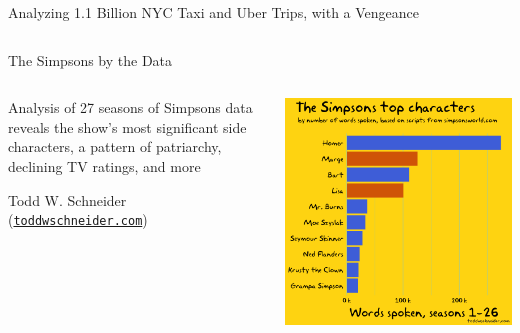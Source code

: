 \documentclass[10pt,aspectratio=169]{beamer}
\begin{document}
\begin{frame}{Analyzing 1.1 Billion NYC Taxi and Uber Trips, with a Vengeance}
\begin{columns}
\begin{column}{.3\textwidth}
\begin{center}
      \end{center}
    \end{column}
  \end{columns}
\end{frame}


\begin{frame}{The Simpsons by the Data}
  \begin{columns}
    \begin{column}{.5\textwidth}
      Analysis of 27 seasons of Simpsons data reveals the show’s most
      significant side characters, a pattern of patriarchy, declining TV
      ratings, and more
    \begin{flushright}
      \small \textnormal Todd W. Schneider
                         (\href{https://toddwschneider.com/posts/the-simpsons-by-the-data/}{\tt toddwschneider.com})
    \end{flushright}
    \end{column}
    \begin{column}{.4\textwidth}
      \begin{center}
        \includegraphics[width=\textwidth]{simpsons.png}
      \end{center}      
    \end{column}
  \end{columns}
\end{frame}
\end{document}
